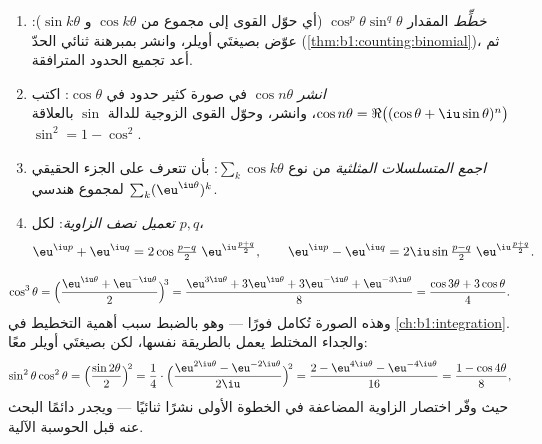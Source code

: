 \begin{method}\label{met:b1:complex:trig}
\begin{enumerate}
  \item \emph{خطِّط} المقدار $\cos^p\theta \sin^q\theta$ (أي حوّل القوى إلى
        مجموع من $\cos k\theta$ و $\sin k\theta$): عوّض بصيغتَي
        أويلر، وانشر بمبرهنة ثنائي الحدّ
        (\cref{thm:b1:counting:binomial})، ثم أعد تجميع الحدود المترافقة.
  \item \emph{انشر} $\cos n\theta$ في صورة كثير حدود في $\cos\theta$:
        اكتب $\cos n\theta = \Re\bigl((\cos\theta +
        \iu\sin\theta)^n\bigr)$، وانشر، وحوّل القوى الزوجية
للدالة $\sin$ بالعلاقة $\sin^2 = 1 - \cos^2$.
  \item \emph{اجمع المتسلسلات المثلثية} من نوع $\sum_k \cos k\theta$:
        بأن تتعرف على الجزء الحقيقي لمجموع هندسي $\sum_k
        (\eu^{\iu\theta})^k$.
  \item \emph{تعميل نصف الزاوية}: لكل $p, q$،
        \[
        \eu^{\iu p} + \eu^{\iu q}
        = 2 \cos\tfrac{p - q}{2}\; \eu^{\iu \frac{p+q}{2}},
        \qquad
        \eu^{\iu p} - \eu^{\iu q}
        = 2\iu \sin\tfrac{p - q}{2}\; \eu^{\iu \frac{p+q}{2}} .
        \]
\end{enumerate}
\end{method}

\begin{example}[التخطيط]\label{ex:b1:complex:linearize}
\[
\cos^3\theta
= \Bigl(\frac{\eu^{\iu\theta} + \eu^{-\iu\theta}}{2}\Bigr)^{\!3}
= \frac{\eu^{3\iu\theta} + 3\eu^{\iu\theta} + 3\eu^{-\iu\theta} +
\eu^{-3\iu\theta}}{8}
= \frac{\cos 3\theta + 3\cos\theta}{4}.
\]
وهذه الصورة تُكامل فورًا --- وهو بالضبط سبب أهمية التخطيط في
\cref{ch:b1:integration}. والجداء المختلط يعمل بالطريقة
نفسها، لكن بصيغتَي أويلر معًا:
\[
\sin^2\theta\cos^2\theta
= \Bigl(\frac{\sin2\theta}2\Bigr)^{\!2}
= \frac{1}{4}\cdot
\Bigl(\frac{\eu^{2\iu\theta} - \eu^{-2\iu\theta}}{2\iu}
\Bigr)^{\!2}
= \frac{2 - \eu^{4\iu\theta} - \eu^{-4\iu\theta}}{16}
= \frac{1 - \cos4\theta}{8} ,
\]
حيث وفّر اختصار الزاوية المضاعفة في الخطوة الأولى نشرًا ثنائيًا
--- ويجدر دائمًا البحث عنه قبل الحوسبة الآلية.
\end{example}

